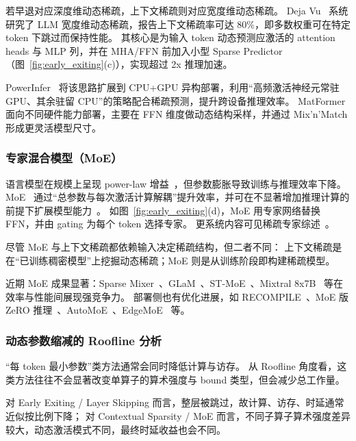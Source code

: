 若早退对应深度维动态稀疏，上下文稀疏则对应宽度维动态稀疏。
Deja Vu~\cite{liu2023deja} 系统研究了 LLM 宽度维动态稀疏，报告上下文稀疏率可达 80\%，即多数权重可在特定 token 下跳过而保持性能。
其核心是为输入 token 动态预测应激活的 attention heads 与 MLP 列，并在 MHA/FFN 前加入小型 Sparse Predictor（图~\ref{fig:early_exiting}(c)），实现超过 2x 推理加速。

PowerInfer~\cite{song2023powerinfer} 将该思路扩展到 CPU+GPU 异构部署，利用“高频激活神经元常驻 GPU、其余驻留 CPU”的策略配合稀疏预测，提升跨设备推理效率。
MatFormer~\cite{devvrit2023matformer} 面向不同硬件能力部署，主要在 FFN 维度做动态结构采样，并通过 Mix’n’Match 形成更灵活模型尺寸。

\subsubsection{专家混合模型（MoE）}
\label{mioe}

语言模型在规模上呈现 power-law 增益~\cite{kaplan2020scaling,hoffmann2022training}，但参数膨胀导致训练与推理效率下降。
MoE~\cite{6215056} 通过“总参数与每次激活计算解耦”提升效率，并可在不显著增加推理计算的前提下扩展模型能力~\cite{lepikhin2020gshard,fedus2021switch}。
如图~\ref{fig:early_exiting}(d)，MoE 用专家网络替换 FFN，并由 gating 为每个 token 选择专家。
更系统内容可见稀疏专家综述~\cite{fedus2022review}。

尽管 MoE 与上下文稀疏都依赖输入决定稀疏结构，但二者不同：
上下文稀疏是在“已训练稠密模型”上挖掘动态稀疏；MoE 则是从训练阶段即构建稀疏模型。

近期 MoE 成果显著：Sparse Mixer~\cite{lee2022sparse}、GLaM~\cite{du2022glam}、ST-MoE~\cite{zoph2022st}、Mixtral 8x7B~\cite{jiang2024mixtral} 等在效率与性能间展现强竞争力。
部署侧也有优化进展，如 RECOMPILE~\cite{kossmann2022optimizing}、MoE 版 ZeRO 推理~\cite{rajbhandari2022deepspeed}、AutoMoE~\cite{jawahar2023automoe}、EdgeMoE~\cite{yi2023edgemoe} 等。

\subsubsection{动态参数缩减的 Roofline 分析}

“每 token 最小参数”类方法通常会同时降低计算与访存。
从 Roofline 角度看，这类方法往往不会显著改变单算子的算术强度与 bound 类型，但会减少总工作量。

对 Early Exiting / Layer Skipping 而言，整层被跳过，故计算、访存、时延通常近似按比例下降；
对 Contextual Sparsity / MoE 而言，不同子算子算术强度差异较大，动态激活模式不同，最终时延收益也会不同。

